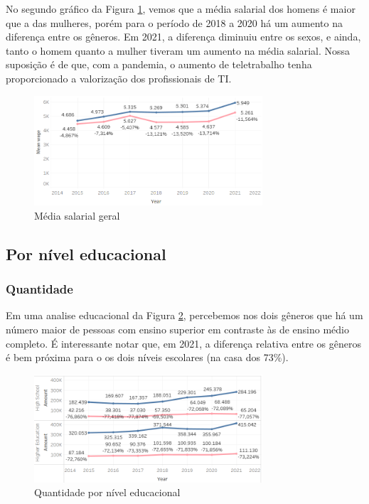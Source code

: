 No segundo gráfico da Figura \ref{fig_1_sal}, vemos que a média salarial dos homens é maior que a das mulheres, porém para o período de 2018 a 2020 há um aumento na diferença entre os gêneros. Em 2021, a diferença diminuiu entre os sexos, e ainda, tanto o homem quanto a mulher tiveram um aumento na média salarial. Nossa suposição é de que, com a pandemia, o aumento de teletrabalho tenha proporcionado a valorização dos profissionais de TI.

\begin{figure}[htbp]
	\centerline{
		\includegraphics[width=85mm]{assets/1_sal.PNG}
	}
	\caption{Média salarial geral}
	\label{fig_1_sal}
\end{figure}


\subsection{Por nível educacional}  \label{sub:educ}

\subsubsection{Quantidade}

Em uma analise educacional da Figura \ref{fig_2_qnt_educ}, percebemos nos dois gêneros que há um número maior de pessoas com ensino superior em contraste às de ensino médio completo. É interessante notar que, em 2021, a diferença relativa entre os gêneros é bem próxima para o os dois níveis escolares (na casa dos 73\%).

\begin{figure}[htbp]
	\centerline{
		\includegraphics[width=85mm]{assets/2_qnt_educ.PNG}
	}
	\caption{Quantidade por nível educacional}
	\label{fig_2_qnt_educ}
\end{figure}

